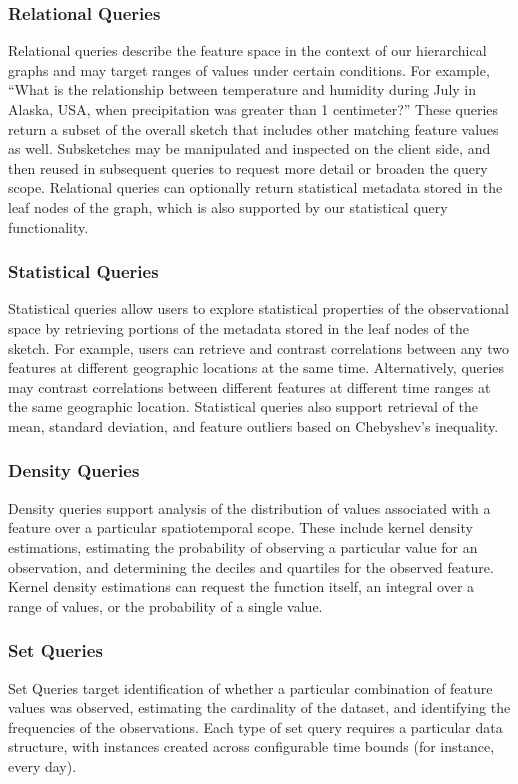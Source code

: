 \subsubsection{Relational Queries}
Relational queries describe the feature space in the context of our hierarchical graphs and may target ranges of values under certain conditions. For example, ``What is the relationship between temperature and humidity during July in Alaska, USA, when precipitation was greater than 1 centimeter?'' These queries return a subset of the overall sketch that includes other matching feature values as well. Subsketches may be manipulated and inspected on the client side, and then reused in subsequent queries to request more detail or broaden the query scope. Relational queries can optionally return statistical metadata stored in the leaf nodes of the graph, which is also supported by our statistical query functionality.

\subsubsection{Statistical Queries}
Statistical queries allow users to explore statistical properties of the observational space by retrieving portions of the metadata stored in the leaf nodes of the sketch. For example, users can retrieve and contrast correlations between any two features at different geographic locations at the same time. Alternatively, queries may contrast correlations between different features at different time ranges at the same geographic location. Statistical queries also support retrieval of the mean, standard deviation, and feature outliers based on Chebyshev's inequality.

\subsubsection{Density Queries}
Density queries support analysis of the distribution of values associated with a feature over a particular spatiotemporal scope. These include kernel density estimations, estimating the probability of observing a particular value for an observation, and determining the deciles and quartiles for the observed feature. Kernel density estimations can request the function itself, an integral over a range of values, or the probability of a single value.

\subsubsection{Set Queries}
Set Queries target identification of whether a particular combination of feature values was observed, estimating the cardinality of the dataset, and identifying the frequencies of the observations. Each type of set query requires a particular data structure, with instances created across configurable time bounds (for instance, every day).

